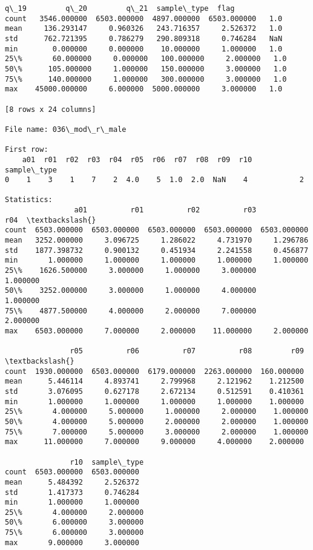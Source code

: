 \documentclass[11pt]{article}
\begin{document}
\begin{Verbatim}[commandchars=\\\{\}]
               q\_19         q\_20         q\_21  sample\_type  flag  
count   3546.000000  6503.000000  4897.000000  6503.000000   1.0  
mean     136.293147     0.960326   243.716357     2.526372   1.0  
std      762.721395     0.786279   290.809318     0.746284   NaN  
min        0.000000     0.000000    10.000000     1.000000   1.0  
25\%       60.000000     0.000000   100.000000     2.000000   1.0  
50\%      105.000000     1.000000   150.000000     3.000000   1.0  
75\%      140.000000     1.000000   300.000000     3.000000   1.0  
max    45000.000000     6.000000  5000.000000     3.000000   1.0  

[8 rows x 24 columns]

File name: 036\_mod\_r\_male

First row: 
    a01  r01  r02  r03  r04  r05  r06  r07  r08  r09  r10  sample\_type
0    1    3    1    7    2  4.0    5  1.0  2.0  NaN    4            2

Statistics: 
                a01          r01          r02          r03          r04  \textbackslash{}
count  6503.000000  6503.000000  6503.000000  6503.000000  6503.000000   
mean   3252.000000     3.096725     1.286022     4.731970     1.296786   
std    1877.398732     0.900132     0.451934     2.241558     0.456877   
min       1.000000     1.000000     1.000000     1.000000     1.000000   
25\%    1626.500000     3.000000     1.000000     3.000000     1.000000   
50\%    3252.000000     3.000000     1.000000     4.000000     1.000000   
75\%    4877.500000     4.000000     2.000000     7.000000     2.000000   
max    6503.000000     7.000000     2.000000    11.000000     2.000000   

               r05          r06          r07          r08         r09  \textbackslash{}
count  1930.000000  6503.000000  6179.000000  2263.000000  160.000000   
mean      5.446114     4.893741     2.799968     2.121962    1.212500   
std       3.076095     0.627178     2.672134     0.512591    0.410361   
min       1.000000     1.000000     1.000000     1.000000    1.000000   
25\%       4.000000     5.000000     1.000000     2.000000    1.000000   
50\%       4.000000     5.000000     2.000000     2.000000    1.000000   
75\%       7.000000     5.000000     3.000000     2.000000    1.000000   
max      11.000000     7.000000     9.000000     4.000000    2.000000   

               r10  sample\_type  
count  6503.000000  6503.000000  
mean      5.484392     2.526372  
std       1.417373     0.746284  
min       1.000000     1.000000  
25\%       4.000000     2.000000  
50\%       6.000000     3.000000  
75\%       6.000000     3.000000  
max       9.000000     3.000000  


\end{Verbatim}
\end{document}
